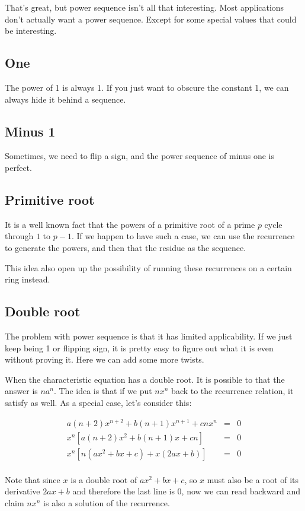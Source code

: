 \documentclass{article}
\begin{document}
That's great, but power sequence isn't all that interesting. Most applications don't actually want a power sequence. Except for some special values that could be interesting.

\subsection*{One}
The power of 1 is always 1. If you just want to obscure the constant 1, we can always hide it behind a sequence.

\subsection*{Minus 1}
Sometimes, we need to flip a sign, and the power sequence of minus one is perfect.

\subsection*{Primitive root}
It is a well known fact that the powers of a primitive root of a prime $ p $ cycle through $ 1 $ to $ p - 1$. If we happen to have such a case, we can use the recurrence to generate the powers, and then that the residue as the sequence.

This idea also open up the possibility of running these recurrences on a certain ring instead.

\subsection{Double root}
The problem with power sequence is that it has limited applicability. If we just keep being 1 or flipping sign, it is pretty easy to figure out what it is even without proving it. Here we can add some more twists.

When the characteristic equation has a double root. It is possible to that the answer is $ na^n $. The idea is that if we put $ nx^n $ back to the recurrence relation, it satisfy as well. As a special case, let's consider this:

\begin{eqnarray*}
  a(n+2)x^{n+2} + b(n+1)x^{n+1} + cnx^n &=& 0 \\
  x^n[a(n+2)x^2 + b(n+1)x + cn] &=& 0 \\
  x^n[n(ax^2 + bx + c) + x(2ax + b)] &=& 0 \\
\end{eqnarray*}

Note that since $ x $ is a double root of $ ax^2 + bx + c $, so $ x $ must also be a root of its derivative $ 2ax + b $ and therefore the last line is 0, now we can read backward and claim $ nx^n $ is also a solution of the recurrence.
\end{document}

